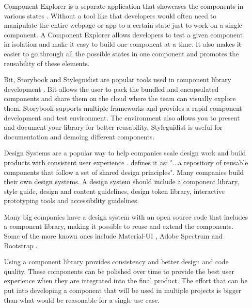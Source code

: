 \documentclass{master_thesis}
\begin{document}
Component Explorer is a separate application that showcases the components in various states \citep{Coleman2017}. Without a tool like that developers would often need to manipulate the entire webpage or app to a certain state just to work on a single component. A Component Explorer allows developers to test a given component in isolation and make it easy to build one component at a time. It also makes it easier to go through all the possible states in one component and promotes the reusability of these elements.

Bit, Storybook and Styleguidist are popular tools used in component library development \citep{Ella2019}. Bit allows the user to pack the bundled and encapsulated components and share them on the cloud where the team can visually explore them. Storybook supports multiple frameworks and provides a rapid component development and test environment. The environment also allows you to present and document your library for better reusability. Styleguidist is useful for documentation and demoing different components.

Design Systems are a popular way to help companies scale design work and build products with consistent user experience \citep{Yew2020}. \citeauthor{Yew2020} defines it as: "...a repository of reusable components that follow a set of shared design principles". Many companies build their own design systems. A design system should include a component library, style guide, design and content guidelines, design token library, interactive prototyping tools and accessibility guidelines.

Many big companies have a design system with an open source code that includes a component library, making it possible to reuse and extend the components. Some of the more known ones include Material-UI \citep{MUS}, Adobe Spectrum \citep{Adobe} and Bootstrap \citep{Collings}.




Using a component library provides consistency and better design and code quality. These components can be polished over time to provide the best user experience when they are integrated into the final product. The effort that can be put into developing a component that will be used in multiple projects is bigger than what would be reasonable for a single use case.
\end{document}
